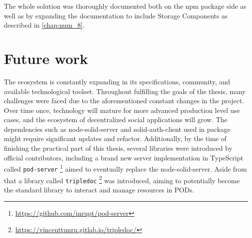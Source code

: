 The whole \lpas{} solution was thoroughly documented both on the npm package side as well as by expanding the \lpa{} documentation to include Storage Components as described in \autoref{chap:num_8}.

\section{Future work}

The \solid{} ecosystem is constantly expanding in its specifications, community, and available technological toolset. Throughout fulfilling the goals of the thesis, many challenges were faced due to the aforementioned constant changes in the \solid{} project. Over time once, \solid{} technology will mature for more advanced production level use cases, and the ecosystem of decentralized social applications will grow. The dependencies such as node-solid-server and solid-auth-client used in \lpas{} package might require significant updates and refactor. Additionally, by the time of finishing the practical part of this thesis, several libraries were introduced by official \solid{} contributors, including a brand new \solid{} server implementation in TypeScript called \texttt{pod-server} \footnote{\url{https://github.com/inrupt/pod-server}} aimed to eventually replace the node-solid-server. Aside from that a library called \texttt{tripledoc} \footnote{\url{https://vincenttunru.gitlab.io/tripledoc/}} was introduced, aiming to potentially become the standard library to interact and manage resources in \solid{} PODs. 

